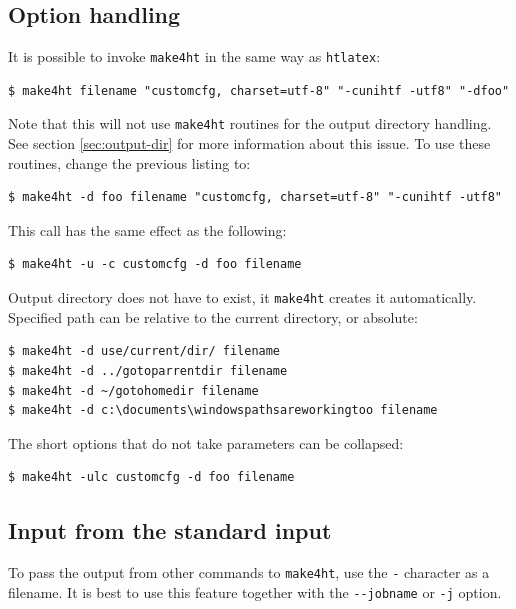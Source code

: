 \subsection{Option handling}\label{option-handling}

It is possible to invoke \texttt{make4ht} in the same way as
\texttt{htlatex}:

\begin{verbatim}
$ make4ht filename "customcfg, charset=utf-8" "-cunihtf -utf8" "-dfoo"
\end{verbatim}

Note that this will not use \texttt{make4ht} routines for the output
directory handling. See section \ref{sec:output-dir} for more
information about this issue. To use these routines, change the previous
listing to:

\begin{verbatim}
$ make4ht -d foo filename "customcfg, charset=utf-8" "-cunihtf -utf8"
\end{verbatim}

This call has the same effect as the following:

\begin{verbatim}
$ make4ht -u -c customcfg -d foo filename
\end{verbatim}

Output directory does not have to exist, it \texttt{make4ht} creates it
automatically. Specified path can be relative to the current directory,
or absolute:

\begin{verbatim}
$ make4ht -d use/current/dir/ filename
$ make4ht -d ../gotoparrentdir filename
$ make4ht -d ~/gotohomedir filename
$ make4ht -d c:\documents\windowspathsareworkingtoo filename
\end{verbatim}

The short options that do not take parameters can be collapsed:

\begin{verbatim}
$ make4ht -ulc customcfg -d foo filename
\end{verbatim}

\subsection{Input from the standard
input}\label{input-from-the-standard-input}

To pass the output from other commands to \texttt{make4ht}, use the
\texttt{-} character as a filename. It is best to use this feature
together with the \texttt{-\/-jobname} or \texttt{-j} option.

